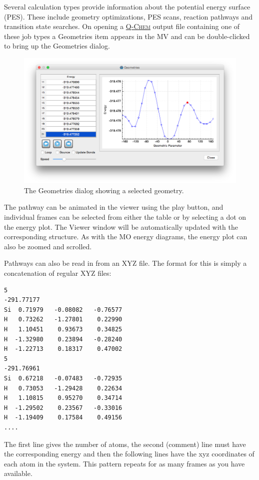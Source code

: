 \documentclass[a4paper,12pt]{article}
\newcommand{\qchem}{\href{https://q-chem.com}{{\scshape Q-Chem}}}
\begin{document}
Several calculation types provide information about the potential energy
surface (PES).  These include geometry optimizations, PES scans, reaction
pathways and transition state searches.  On opening a \qchem{} output file
containing one of these job types a Geometries item appears in the MV and can
be double-clicked to bring up the Geometries dialog.
\begin{figure}[h]
\begin{center}
\includegraphics[scale=0.35]{figures/PesScan.png}
\caption{The Geometries dialog showing a selected geometry. }
\end{center}
\end{figure}

The pathway can be animated in the viewer using the play button, and individual
frames can be selected from either the table or by selecting a dot on the
energy plot.  The Viewer window will be automatically updated with the
corresponding structure.  As with the MO energy diagrams, the energy plot can
also be zoomed and scrolled.

Pathways can also be read in from an XYZ file.  The format for this is simply a
concatenation of regular XYZ files:
{\footnotesize
\begin{verbatim}
5
-291.77177
Si  0.71979   -0.08082   -0.76577  
H   0.73262   -1.27801    0.22990   
H   1.10451    0.93673    0.34825   
H  -1.32980    0.23894   -0.28240  
H  -1.22713    0.18317    0.47002   
5
-291.76961
Si  0.67218   -0.07483   -0.72935  
H   0.73053   -1.29428    0.22634   
H   1.10815    0.95270    0.34714   
H  -1.29502    0.23567   -0.33016  
H  -1.19409    0.17584    0.49156 
....
\end{verbatim}
}
The first line gives the number of atoms, the second (comment) line must have
the corresponding energy and then the following lines have the xyz coordinates
of each atom in the system.  This pattern repeats for as many frames as you have
available.
\end{document}
